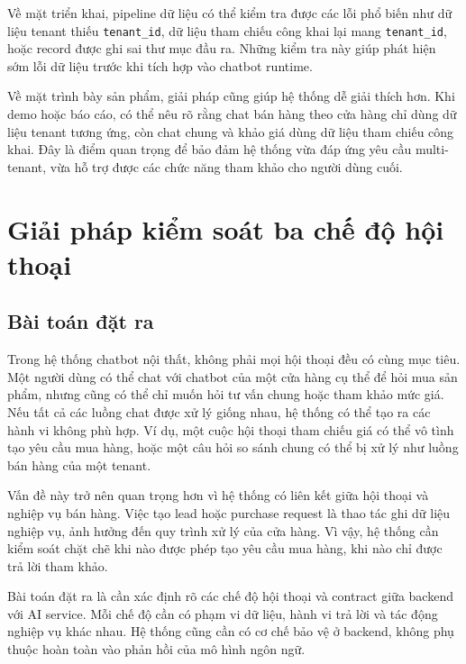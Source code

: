 \documentclass[../DoAn.tex]{subfiles}
\begin{document}
Về mặt triển khai, pipeline dữ liệu có thể kiểm tra được các lỗi phổ biến như dữ liệu tenant thiếu \texttt{tenant\_id}, dữ liệu tham chiếu công khai lại mang \texttt{tenant\_id}, hoặc record được ghi sai thư mục đầu ra. Những kiểm tra này giúp phát hiện sớm lỗi dữ liệu trước khi tích hợp vào chatbot runtime.

Về mặt trình bày sản phẩm, giải pháp cũng giúp hệ thống dễ giải thích hơn. Khi demo hoặc báo cáo, có thể nêu rõ rằng chat bán hàng theo cửa hàng chỉ dùng dữ liệu tenant tương ứng, còn chat chung và khảo giá dùng dữ liệu tham chiếu công khai. Đây là điểm quan trọng để bảo đảm hệ thống vừa đáp ứng yêu cầu multi-tenant, vừa hỗ trợ được các chức năng tham khảo cho người dùng cuối.


\section{Giải pháp kiểm soát ba chế độ hội thoại}
\label{section:5.3}

\subsection{Bài toán đặt ra}
\label{subsection:5.3.1}

Trong hệ thống chatbot nội thất, không phải mọi hội thoại đều có cùng mục tiêu. Một người dùng có thể chat với chatbot của một cửa hàng cụ thể để hỏi mua sản phẩm, nhưng cũng có thể chỉ muốn hỏi tư vấn chung hoặc tham khảo mức giá. Nếu tất cả các luồng chat được xử lý giống nhau, hệ thống có thể tạo ra các hành vi không phù hợp. Ví dụ, một cuộc hội thoại tham chiếu giá có thể vô tình tạo yêu cầu mua hàng, hoặc một câu hỏi so sánh chung có thể bị xử lý như luồng bán hàng của một tenant.

Vấn đề này trở nên quan trọng hơn vì hệ thống có liên kết giữa hội thoại và nghiệp vụ bán hàng. Việc tạo lead hoặc purchase request là thao tác ghi dữ liệu nghiệp vụ, ảnh hưởng đến quy trình xử lý của cửa hàng. Vì vậy, hệ thống cần kiểm soát chặt chẽ khi nào được phép tạo yêu cầu mua hàng, khi nào chỉ được trả lời tham khảo.

Bài toán đặt ra là cần xác định rõ các chế độ hội thoại và contract giữa backend với AI service. Mỗi chế độ cần có phạm vi dữ liệu, hành vi trả lời và tác động nghiệp vụ khác nhau. Hệ thống cũng cần có cơ chế bảo vệ ở backend, không phụ thuộc hoàn toàn vào phản hồi của mô hình ngôn ngữ.
\end{document}
